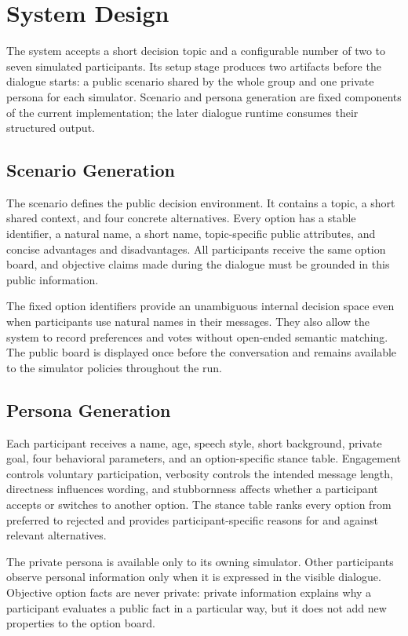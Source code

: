 \section{System Design}

The system accepts a short decision topic and a configurable number of two to seven simulated participants. Its setup stage produces two artifacts before the dialogue starts: a public scenario shared by the whole group and one private persona for each simulator. Scenario and persona generation are fixed components of the current implementation; the later dialogue runtime consumes their structured output.

\subsection{Scenario Generation}

The scenario defines the public decision environment. It contains a topic, a short shared context, and four concrete alternatives. Every option has a stable identifier, a natural name, a short name, topic-specific public attributes, and concise advantages and disadvantages. All participants receive the same option board, and objective claims made during the dialogue must be grounded in this public information.

The fixed option identifiers provide an unambiguous internal decision space even when participants use natural names in their messages. They also allow the system to record preferences and votes without open-ended semantic matching. The public board is displayed once before the conversation and remains available to the simulator policies throughout the run.

\subsection{Persona Generation}

Each participant receives a name, age, speech style, short background, private goal, four behavioral parameters, and an option-specific stance table. Engagement controls voluntary participation, verbosity controls the intended message length, directness influences wording, and stubbornness affects whether a participant accepts or switches to another option. The stance table ranks every option from preferred to rejected and provides participant-specific reasons for and against relevant alternatives.

The private persona is available only to its owning simulator. Other participants observe personal information only when it is expressed in the visible dialogue. Objective option facts are never private: private information explains why a participant evaluates a public fact in a particular way, but it does not add new properties to the option board.

